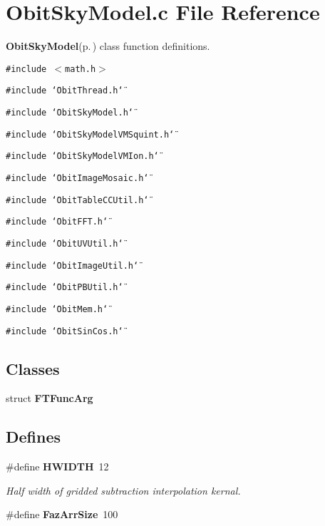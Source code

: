 \section{Obit\-Sky\-Model.c File Reference}
\label{ObitSkyModel_8c}
{\bf Obit\-Sky\-Model}{\rm (p.\,\pageref{structObitSkyModel})} class function definitions. 

{\tt \#include $<$math.h$>$}\par
{\tt \#include \char`\"{}Obit\-Thread.h\char`\"{}}\par
{\tt \#include \char`\"{}Obit\-Sky\-Model.h\char`\"{}}\par
{\tt \#include \char`\"{}Obit\-Sky\-Model\-VMSquint.h\char`\"{}}\par
{\tt \#include \char`\"{}Obit\-Sky\-Model\-VMIon.h\char`\"{}}\par
{\tt \#include \char`\"{}Obit\-Image\-Mosaic.h\char`\"{}}\par
{\tt \#include \char`\"{}Obit\-Table\-CCUtil.h\char`\"{}}\par
{\tt \#include \char`\"{}Obit\-FFT.h\char`\"{}}\par
{\tt \#include \char`\"{}Obit\-UVUtil.h\char`\"{}}\par
{\tt \#include \char`\"{}Obit\-Image\-Util.h\char`\"{}}\par
{\tt \#include \char`\"{}Obit\-PBUtil.h\char`\"{}}\par
{\tt \#include \char`\"{}Obit\-Mem.h\char`\"{}}\par
{\tt \#include \char`\"{}Obit\-Sin\-Cos.h\char`\"{}}\par
\subsection*{Classes}
\begin{CompactItemize}
\item 
struct {\bf FTFunc\-Arg}
\end{CompactItemize}
\subsection*{Defines}
\begin{CompactItemize}
\item 
\#define {\bf HWIDTH}\ 12
\begin{CompactList}\small\item\em Half width of gridded subtraction interpolation kernal. \item\end{CompactList}\item 
\#define {\bf Faz\-Arr\-Size}\ 100
\end{CompactItemize}
